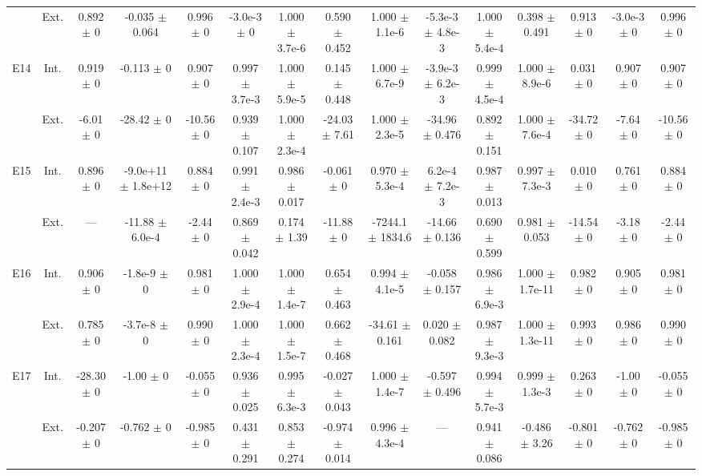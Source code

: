 \begin{table}[htbp]
{\begin{tabular}{@{}ccccccccccccccc@{}}
 & Ext. & 0.892 $\pm$ 0 & -0.035 $\pm$ 0.064 & 0.996 $\pm$ 0 & -3.0e-3 $\pm$ 0 & 1.000 $\pm$ 3.7e-6 & 0.590 $\pm$ 0.452 & 1.000 $\pm$ 1.1e-6 & -5.3e-3 $\pm$ 4.8e-3 & 1.000 $\pm$ 5.4e-4 & 0.398 $\pm$ 0.491 & 0.913 $\pm$ 0 & -3.0e-3 $\pm$ 0 & 0.996 $\pm$ 0 \\
\cline{2-15}
\multirow{2}{*}{E14} & Int. & 0.919 $\pm$ 0 & -0.113 $\pm$ 0 & 0.907 $\pm$ 0 & 0.997 $\pm$ 3.7e-3 & 1.000 $\pm$ 5.9e-5 & 0.145 $\pm$ 0.448 & 1.000 $\pm$ 6.7e-9 & -3.9e-3 $\pm$ 6.2e-3 & 0.999 $\pm$ 4.5e-4 & 1.000 $\pm$ 8.9e-6 & 0.031 $\pm$ 0 & 0.907 $\pm$ 0 & 0.907 $\pm$ 0 \\
 & Ext. & -6.01 $\pm$ 0 & -28.42 $\pm$ 0 & -10.56 $\pm$ 0 & 0.939 $\pm$ 0.107 & 1.000 $\pm$ 2.3e-4 & -24.03 $\pm$ 7.61 & 1.000 $\pm$ 2.3e-5 & -34.96 $\pm$ 0.476 & 0.892 $\pm$ 0.151 & 1.000 $\pm$ 7.6e-4 & -34.72 $\pm$ 0 & -7.64 $\pm$ 0 & -10.56 $\pm$ 0 \\
\cline{2-15}
\multirow{2}{*}{E15} & Int. & 0.896 $\pm$ 0 & -9.0e+11 $\pm$ 1.8e+12 & 0.884 $\pm$ 0 & 0.991 $\pm$ 2.4e-3 & 0.986 $\pm$ 0.017 & -0.061 $\pm$ 0 & 0.970 $\pm$ 5.3e-4 & 6.2e-4 $\pm$ 7.2e-3 & 0.987 $\pm$ 0.013 & 0.997 $\pm$ 7.3e-3 & 0.010 $\pm$ 0 & 0.761 $\pm$ 0 & 0.884 $\pm$ 0 \\
 & Ext. & --- & -11.88 $\pm$ 6.0e-4 & -2.44 $\pm$ 0 & 0.869 $\pm$ 0.042 & 0.174 $\pm$ 1.39 & -11.88 $\pm$ 0 & -7244.1 $\pm$ 1834.6 & -14.66 $\pm$ 0.136 & 0.690 $\pm$ 0.599 & 0.981 $\pm$ 0.053 & -14.54 $\pm$ 0 & -3.18 $\pm$ 0 & -2.44 $\pm$ 0 \\
\cline{2-15}
\multirow{2}{*}{E16} & Int. & 0.906 $\pm$ 0 & -1.8e-9 $\pm$ 0 & 0.981 $\pm$ 0 & 1.000 $\pm$ 2.9e-4 & 1.000 $\pm$ 1.4e-7 & 0.654 $\pm$ 0.463 & 0.994 $\pm$ 4.1e-5 & -0.058 $\pm$ 0.157 & 0.986 $\pm$ 6.9e-3 & 1.000 $\pm$ 1.7e-11 & 0.982 $\pm$ 0 & 0.905 $\pm$ 0 & 0.981 $\pm$ 0 \\
 & Ext. & 0.785 $\pm$ 0 & -3.7e-8 $\pm$ 0 & 0.990 $\pm$ 0 & 1.000 $\pm$ 2.3e-4 & 1.000 $\pm$ 1.5e-7 & 0.662 $\pm$ 0.468 & -34.61 $\pm$ 0.161 & 0.020 $\pm$ 0.082 & 0.987 $\pm$ 9.3e-3 & 1.000 $\pm$ 1.3e-11 & 0.993 $\pm$ 0 & 0.986 $\pm$ 0 & 0.990 $\pm$ 0 \\
\cline{2-15}
\multirow{2}{*}{E17} & Int. & -28.30 $\pm$ 0 & -1.00 $\pm$ 0 & -0.055 $\pm$ 0 & 0.936 $\pm$ 0.025 & 0.995 $\pm$ 6.3e-3 & -0.027 $\pm$ 0.043 & 1.000 $\pm$ 1.4e-7 & -0.597 $\pm$ 0.496 & 0.994 $\pm$ 5.7e-3 & 0.999 $\pm$ 1.3e-3 & 0.263 $\pm$ 0 & -1.00 $\pm$ 0 & -0.055 $\pm$ 0 \\
 & Ext. & -0.207 $\pm$ 0 & -0.762 $\pm$ 0 & -0.985 $\pm$ 0 & 0.431 $\pm$ 0.291 & 0.853 $\pm$ 0.274 & -0.974 $\pm$ 0.014 & 0.996 $\pm$ 4.3e-4 & --- & 0.941 $\pm$ 0.086 & -0.486 $\pm$ 3.26 & -0.801 $\pm$ 0 & -0.762 $\pm$ 0 & -0.985 $\pm$ 0 \\

\end{tabular}}
\end{table}

